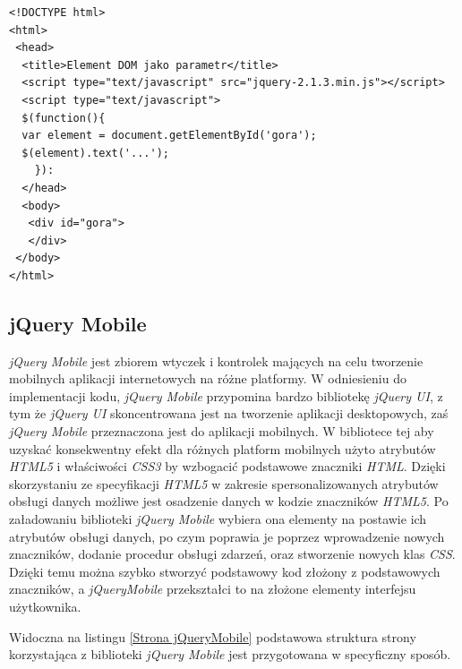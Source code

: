 \documentclass{iiuwb}
\begin{document}
\begin{lstlisting}[label=Parametr element DOM, caption=Wywołanie funkcji przyjmującej jako parametr element drzewa DOM]
<!DOCTYPE html>
<html>
 <head>
  <title>Element DOM jako parametr</title>
  <script type="text/javascript" src="jquery-2.1.3.min.js"></script>
  <script type="text/javascript">
  $(function(){
  var element = document.getElementById('gora');
  $(element).text('...');
    }):
  </head>
  <body>
   <div id="gora">
   </div>
 </body>
</html>
\end{lstlisting}

\subsection{jQuery Mobile}
\textit{jQuery Mobile} jest zbiorem wtyczek i kontrolek mających na celu tworzenie mobilnych aplikacji internetowych na różne platformy. W odniesieniu do implementacji kodu, \textit{jQuery Mobile} przypomina bardzo bibliotekę \textit{jQuery UI}, z tym że \textit{jQuery UI} skoncentrowana jest na tworzenie aplikacji desktopowych, zaś \textit{jQuery Mobile} przeznaczona jest do aplikacji mobilnych. W bibliotece tej aby uzyskać konsekwentny efekt dla różnych platform mobilnych użyto atrybutów \textit{HTML5} i właściwości \textit{CSS3} by wzbogacić podstawowe znaczniki \textit{HTML}. Dzięki skorzystaniu ze specyfikacji \textit{HTML5} w zakresie spersonalizowanych atrybutów obsługi danych możliwe jest osadzenie danych w kodzie znaczników \textit{HTML5}. Po załadowaniu biblioteki \textit{jQuery Mobile} wybiera ona elementy na postawie ich atrybutów obsługi danych, po czym poprawia je poprzez wprowadzenie nowych znaczników, dodanie procedur obsługi zdarzeń, oraz stworzenie nowych klas \textit{CSS}. Dzięki temu można szybko stworzyć podstawowy kod złożony z podstawowych znaczników, a \textit{jQueryMobile} przekształci to na złożone elementy interfejsu użytkownika. 

Widoczna na listingu \ref{Strona jQueryMobile} podstawowa struktura strony korzystająca z biblioteki \textit{jQuery Mobile} jest przygotowana w specyficzny sposób. 
\end{document}
